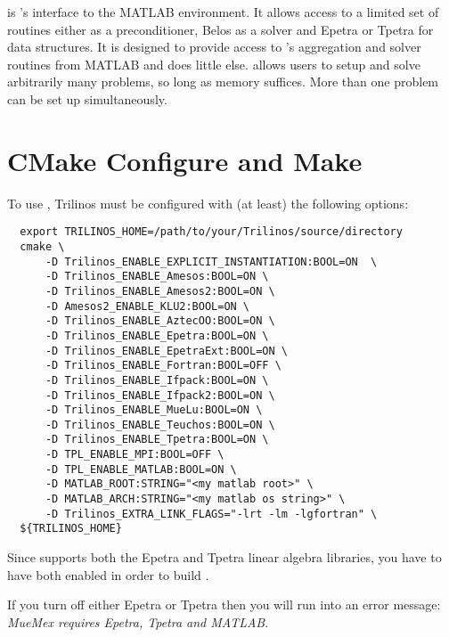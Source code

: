 
\muemex is \muelu's interface to the MATLAB environment. It allows access
to a limited set of routines either \muelu as a preconditioner,
Belos as a solver and Epetra or Tpetra for data structures.
It is designed to provide access to \muelu's aggregation and
solver routines from MATLAB and does little else. \muemex allows users to
setup and solve arbitrarily many problems, so long as memory suffices.
More than one problem can be set up simultaneously.

\section{CMake Configure and Make}\label{sec:muemex:cmake}
To use \muemex, Trilinos must be configured with (at least) the
following options:

\begin{lstlisting}
  export TRILINOS_HOME=/path/to/your/Trilinos/source/directory
  cmake \
      -D Trilinos_ENABLE_EXPLICIT_INSTANTIATION:BOOL=ON  \
      -D Trilinos_ENABLE_Amesos:BOOL=ON \
      -D Trilinos_ENABLE_Amesos2:BOOL=ON \
      -D Amesos2_ENABLE_KLU2:BOOL=ON \
      -D Trilinos_ENABLE_AztecOO:BOOL=ON \
      -D Trilinos_ENABLE_Epetra:BOOL=ON \
      -D Trilinos_ENABLE_EpetraExt:BOOL=ON \
      -D Trilinos_ENABLE_Fortran:BOOL=OFF \
      -D Trilinos_ENABLE_Ifpack:BOOL=ON \
      -D Trilinos_ENABLE_Ifpack2:BOOL=ON \
      -D Trilinos_ENABLE_MueLu:BOOL=ON \
      -D Trilinos_ENABLE_Teuchos:BOOL=ON \
      -D Trilinos_ENABLE_Tpetra:BOOL=ON \
      -D TPL_ENABLE_MPI:BOOL=OFF \
      -D TPL_ENABLE_MATLAB:BOOL=ON \
      -D MATLAB_ROOT:STRING="<my matlab root>" \
      -D MATLAB_ARCH:STRING="<my matlab os string>" \
      -D Trilinos_EXTRA_LINK_FLAGS="-lrt -lm -lgfortran" \
  ${TRILINOS_HOME}
\end{lstlisting}

Since \muemex supports both the Epetra and Tpetra linear algebra
libraries, you have to have both enabled in order to build \muemex.
\begin{mycomment}
If you turn off either Epetra or Tpetra then you will run into an error message: \textit{MueMex requires Epetra, Tpetra and MATLAB}.
\end{mycomment}

